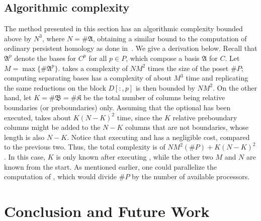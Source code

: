 \documentclass[11pt, table, nothms]{amsart}
\theoremstyle{definition}
\newcommand{\C}{C}
\newcommand{\fA}{\mathfrak{A}}
\newcommand{\fB}{\mathfrak{B}}
\newcommand{\fK}{\mathfrak{K}}
\begin{document}
{%
\subsection*{Algorithmic complexity}
The method presented in this section has an algorithmic complexity bounded above by $N^3$, where $N=\#\fA$, obtaining a similar bound to the computation of ordinary persistent homology as done in~\cite{Dey2024ComputingReductions,Dey2025ComputingDecomposition}. 
We give a derivation below. 
Recall that $\fA^p$ denote the bases for $\C^p$ for all $p \in P$, which compose a basis $\fA$ for $C$.
Let $M = \max\{\#\fA^p\}$. 
 takes a complexity of $NM^2$ times the size of the poset $\#P$; computing separating bases has a complexity of about $M^3$ time and replicating the same reductions on the block $D[:,p]$ is then bounded by $NM^2$. 
On the other hand, let $K=\#\fB=\#\fK$ be the total number of columns being relative boundaries (or preboundaries) only.
Assuming that the optional  has been executed,  takes about $K(N-K)^2$ time, since the $K$ relative preboundary columns might be added to the $N-K$ columns that are not boundaries, whose length is also $N-K$. 
Notice that executing  and  has a negligible cost,  compared to the previous two.
Thus, the total complexity is of $NM^2(\#P) + K(N-K)^2$. In this case, $K$ is only known after executing , while the other two $M$ and $N$ are known from the start. 
As mentioned earlier, one could parallelize the computation of , which would divide $\#P$ by the number of available processors.

\section{Conclusion and Future Work}
\label{sec:conclusion}

}
\end{document}
